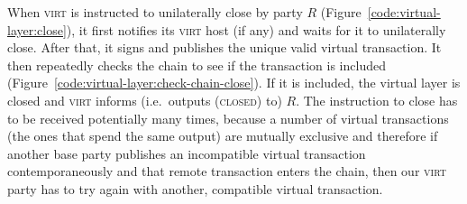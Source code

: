   When \textsc{virt} is instructed to unilaterally close by party $R$
  (Figure~\ref{code:virtual-layer:close}), it first notifies its \textsc{virt}
  host (if any) and waits for it to unilaterally close. After that, it signs and publishes
  the unique valid virtual transaction. It then repeatedly checks the chain to
  see if the transaction is included
  (Figure~\ref{code:virtual-layer:check-chain-close}). If it is included, the
  virtual layer is closed and \textsc{virt} informs (i.e.\ outputs
  (\textsc{closed}) to) $R$. The
  instruction to close has to be received potentially many times, because a
  number of virtual transactions (the ones that spend the same output) are
  mutually exclusive and therefore if another base party publishes an
  incompatible virtual transaction contemporaneously and that remote transaction
  enters the chain, then our \textsc{virt} party has to try again with another,
  compatible virtual transaction.
